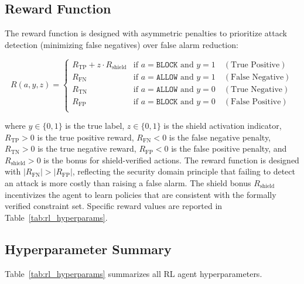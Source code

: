 \documentclass[12pt, letterpaper, oneside]{report}
\begin{document}
\subsection{Reward Function}
\label{sec:reward_function}

The reward function is designed with asymmetric penalties to prioritize attack detection (minimizing false negatives) over false alarm reduction:

\begin{equation}
\label{eq:reward}
R(a, y, z) = \begin{cases}
R_{\text{TP}} + z \cdot R_{\text{shield}} & \text{if } a = \texttt{BLOCK} \text{ and } y = 1 \quad (\text{True Positive}) \\
R_{\text{FN}} & \text{if } a = \texttt{ALLOW} \text{ and } y = 1 \quad (\text{False Negative}) \\
R_{\text{TN}} & \text{if } a = \texttt{ALLOW} \text{ and } y = 0 \quad (\text{True Negative}) \\
R_{\text{FP}} & \text{if } a = \texttt{BLOCK} \text{ and } y = 0 \quad (\text{False Positive}) \\
\end{cases}
\end{equation}

\noindent where $y \in \{0, 1\}$ is the true label, $z \in \{0, 1\}$ is the shield activation indicator, $R_{\text{TP}} > 0$ is the true positive reward, $R_{\text{FN}} < 0$ is the false negative penalty, $R_{\text{TN}} > 0$ is the true negative reward, $R_{\text{FP}} < 0$ is the false positive penalty, and $R_{\text{shield}} > 0$ is the bonus for shield-verified actions. The reward function is designed with $|R_{\text{FN}}| > |R_{\text{FP}}|$, reflecting the security domain principle that failing to detect an attack is more costly than raising a false alarm. The shield bonus $R_{\text{shield}}$ incentivizes the agent to learn policies that are consistent with the formally verified constraint set. Specific reward values are reported in Table~\ref{tab:rl_hyperparams}.

\subsection{Hyperparameter Summary}

Table~\ref{tab:rl_hyperparams} summarizes all RL agent hyperparameters.
\end{document}
